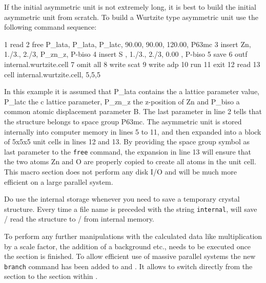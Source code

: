 
If the initial asymmetric unit is not extremely long, it is best to build
the initial asymmetric unit from scratch. To build a Wurtzite type asymmetric
unit use the following command sequence:

\begin{MacVerbatim}
1   read
2      free P_lata, P_lata, P_latc, 90.00, 90.00, 120.00, P63mc
3   insert Zn, 1./3.,  2./3, P_zn_z, P-biso
4   insert S , 1./3.,  2./3, 0.00  , P-biso
5   save
6      outf internal.wurtzite.cell
7      omit all
8      write scat
9      write adp
10     run
11  exit
12  read
13     cell internal.wurtzite.cell, 5,5,5
\end{MacVerbatim}

In this example it is assumed that P\_lata      contains the a lattice parameter 
value, P\_latc      the c lattice parameter, P\_zn\_z     the z-position of Zn 
and P\_biso     
a common atomic displacement parameter B. The last parameter in line 2 tells
\Discus that the structure belongs to space group P63mc. The asymmetric unit
is stored internally into computer memory  in lines 5 to 11, and then expanded
into a block of 5x5x5 unit cells in lines 12 and 13. By providing the space
group symbol as last parameter to the {\tt free} command, the expansion in line
13 will ensure that the two atoms Zn and O are properly copied to create all
atoms in the unit cell. This macro section does not perform any disk I/O and
will be much more efficient on a large parallel system.

Do use the internal storage whenever you need to save a temporary crystal 
structure. Every time a file name is preceded with the string {\tt internal},
\Discus will save / read the structure to / from internal memory.

To perform any further manipulations with the calculated data like 
multiplication by a scale factor, the addition of a background etc., \Kuplot
needs to be executed once the \Discus section is finished. To allow
efficient use of massive parallel systems the new {\tt branch} command has 
been added to \Discus and \kuplot. It allows to switch directly from the
\Discus section to the \Kuplot section within \suite. 

